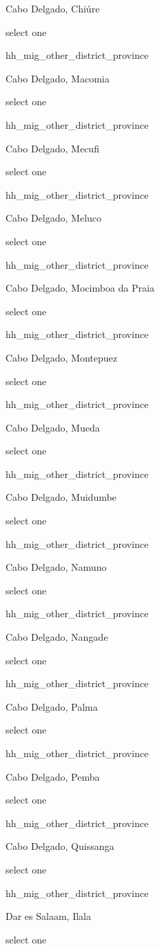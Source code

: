 \documentclass[]{article}
\begin{document}
Cabo Delgado, Chiúre

select one

hh\_mig\_other\_district\_province

Cabo Delgado, Macomia

select one

hh\_mig\_other\_district\_province

Cabo Delgado, Mecufi

select one

hh\_mig\_other\_district\_province

Cabo Delgado, Meluco

select one

hh\_mig\_other\_district\_province

Cabo Delgado, Mocimboa da Praia

select one

hh\_mig\_other\_district\_province

Cabo Delgado, Montepuez

select one

hh\_mig\_other\_district\_province

Cabo Delgado, Mueda

select one

hh\_mig\_other\_district\_province

Cabo Delgado, Muidumbe

select one

hh\_mig\_other\_district\_province

Cabo Delgado, Namuno

select one

hh\_mig\_other\_district\_province

Cabo Delgado, Nangade

select one

hh\_mig\_other\_district\_province

Cabo Delgado, Palma

select one

hh\_mig\_other\_district\_province

Cabo Delgado, Pemba

select one

hh\_mig\_other\_district\_province

Cabo Delgado, Quissanga

select one

hh\_mig\_other\_district\_province

Dar es Salaam, Ilala

select one
\end{document}
